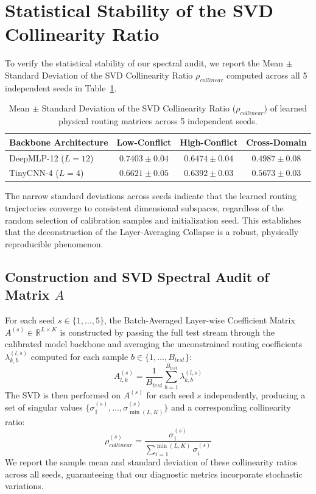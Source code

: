 \section{Statistical Stability of the SVD Collinearity Ratio}
\label{app:collinearity_stability}

To verify the statistical stability of our spectral audit, we report the Mean $\pm$ Standard Deviation of the SVD Collinearity Ratio $\rho_{collinear}$ computed across all 5 independent seeds in Table~\ref{tab:collinearity_std_dev}.

\begin{table}[h]
\caption{Mean $\pm$ Standard Deviation of the SVD Collinearity Ratio ($\rho_{collinear}$) of learned physical routing matrices across 5 independent seeds.}
\label{tab:collinearity_std_dev}
\vskip 0.15in
\begin{center}
\begin{small}
\begin{sc}
\begin{tabular}{lccc}
\toprule
\textbf{Backbone Architecture} & \textbf{Low-Conflict} & \textbf{High-Conflict} & \textbf{Cross-Domain} \\
\midrule
DeepMLP-12 ($L=12$) & $0.7403 \pm 0.04$ & $0.6474 \pm 0.04$ & $\mathbf{0.4987 \pm 0.08}$ \\
TinyCNN-4 ($L=4$)   & $0.6621 \pm 0.05$ & $0.6392 \pm 0.03$ & $\mathbf{0.5673 \pm 0.03}$ \\
\bottomrule
\end{tabular}
\end{sc}
\end{small}
\end{center}
\end{table}

The narrow standard deviations across seeds indicate that the learned routing trajectories converge to consistent dimensional subspaces, regardless of the random selection of calibration samples and initialization seed. This establishes that the deconstruction of the Layer-Averaging Collapse is a robust, physically reproducible phenomenon.

\subsection{Construction and SVD Spectral Audit of Matrix $A$}
For each seed $s \in \{1, \dots, 5\}$, the Batch-Averaged Layer-wise Coefficient Matrix $A^{(s)} \in \mathbb{R}^{L \times K}$ is constructed by passing the full test stream through the calibrated model backbone and averaging the unconstrained routing coefficients $\lambda_{k, b}^{(l, s)}$ computed for each sample $b \in \{1, \dots, B_{test}\}$:
$$A^{(s)}_{l, k} = \frac{1}{B_{test}} \sum_{b=1}^{B_{test}} \lambda_{k, b}^{(l, s)}$$
The SVD is then performed on $A^{(s)}$ for each seed $s$ independently, producing a set of singular values $\{\sigma_1^{(s)}, \dots, \sigma_{\min(L, K)}^{(s)}\}$ and a corresponding collinearity ratio:
$$\rho_{collinear}^{(s)} = \frac{\sigma_1^{(s)}}{\sum_{i=1}^{\min(L, K)} \sigma_i^{(s)}}$$
We report the sample mean and standard deviation of these collinearity ratios across all seeds, guaranteeing that our diagnostic metrics incorporate stochastic variations.

